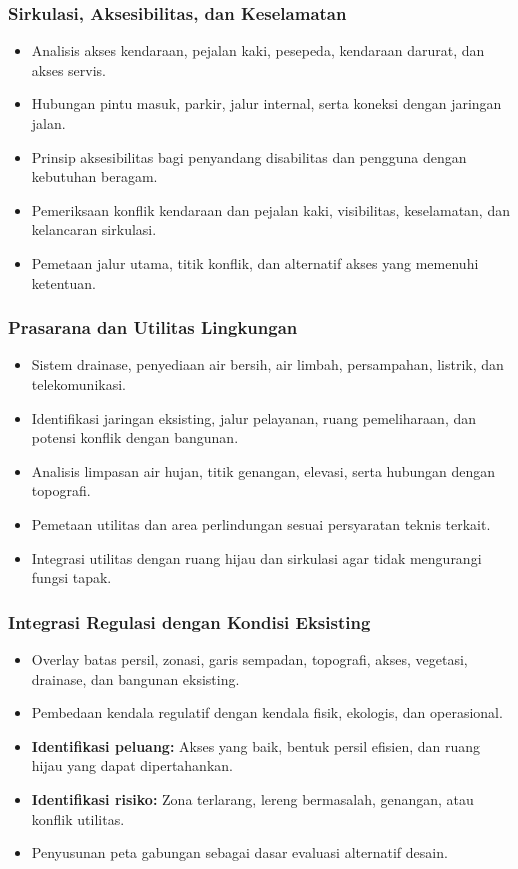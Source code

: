 \documentclass[../main.tex]{subfiles}
\begin{document}
\begin{frame}[mytitle=center, c, mycolor=digiPH_gray]
	\frametitle{Sirkulasi, Aksesibilitas, dan Keselamatan}
	\begin{itemize}
		\item Analisis akses kendaraan, pejalan kaki, pesepeda, kendaraan darurat, dan akses servis.
		\item Hubungan pintu masuk, parkir, jalur internal, serta koneksi dengan jaringan jalan.
		\item Prinsip aksesibilitas bagi penyandang disabilitas dan pengguna dengan kebutuhan beragam.
		\item Pemeriksaan konflik kendaraan dan pejalan kaki, visibilitas, keselamatan, dan kelancaran sirkulasi.
		\item Pemetaan jalur utama, titik konflik, dan alternatif akses yang memenuhi ketentuan.
	\end{itemize}
\end{frame}

\begin{frame}[mytitle=standard, t, mycolor=white]
	\frametitle{Prasarana dan Utilitas Lingkungan}
	\begin{itemize}
		\item Sistem drainase, penyediaan air bersih, air limbah, persampahan, listrik, dan telekomunikasi.
		\item Identifikasi jaringan eksisting, jalur pelayanan, ruang pemeliharaan, dan potensi konflik dengan bangunan.
		\item Analisis limpasan air hujan, titik genangan, elevasi, serta hubungan dengan topografi.
		\item Pemetaan utilitas dan area perlindungan sesuai persyaratan teknis terkait.
		\item Integrasi utilitas dengan ruang hijau dan sirkulasi agar tidak mengurangi fungsi tapak.
	\end{itemize}
\end{frame}

\begin{frame}[mytitle=standard, t, mycolor=digiPH_cream]
	\frametitle{Integrasi Regulasi dengan Kondisi Eksisting}
	\begin{itemize}
		\item Overlay batas persil, zonasi, garis sempadan, topografi, akses, vegetasi, drainase, dan bangunan eksisting.
		\item Pembedaan kendala regulatif dengan kendala fisik, ekologis, dan operasional.
		\item \textbf{Identifikasi peluang:} Akses yang baik, bentuk persil efisien, dan ruang hijau yang dapat dipertahankan.
		\item \textbf{Identifikasi risiko:} Zona terlarang, lereng bermasalah, genangan, atau konflik utilitas.
		\item Penyusunan peta gabungan sebagai dasar evaluasi alternatif desain.
	\end{itemize}
\end{frame}
\end{document}
